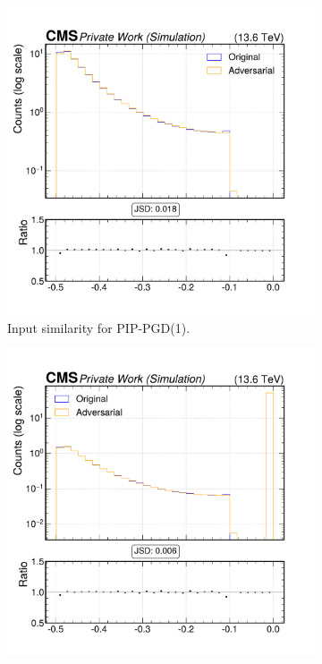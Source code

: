 \begin{figure}[h]
  \centering
  \begin{subfigure}[t]{0.32\textwidth}
    \includegraphics[width=\linewidth]{media/output/features/compare/combined_it_1/cmp_vtx_arr_sv_deltaR.pdf}
    \caption*{Input similarity for PIP-PGD(1).}
  \end{subfigure}\hfill
  \begin{subfigure}[t]{0.32\textwidth}
    \includegraphics[width=\linewidth]{media/output/features/compare/combined_it_2/cmp_vtx_arr_sv_deltaR.pdf}

\end{subfigure}
\end{figure}
